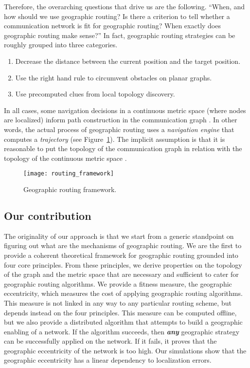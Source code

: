\documentclass{article}
\begin{document}
Therefore, the overarching questions that drive us are the following. ``When, and how should we use geographic routing? Is there a criterion to tell whether a communication network is fit for geographic routing? When exactly does geographic routing make sense?''
In fact, geographic routing strategies can be roughly grouped into three categories.
\begin{enumerate}
\item Decrease the distance between the current position and the target position.
\item Use the right hand rule to circumvent obstacles on planar graphs.
\item Use precomputed clues from local topology discovery.
\end{enumerate}
In all cases, some navigation decisions in a continuous metric space  (where nodes are localized) inform path construction in the communication graph . In other words, the actual process of geographic routing uses a {\em navigation engine} that computes a {\em trajectory} (see Figure~\ref{fig_routing}). The implicit assumption is that it is reasonable to put the topology of the communication graph  in relation with the topology of the continuous metric space .

\begin{figure}[h]
\begin{center}
\texttt{[image: routing\_framework]}
\caption{Geographic routing framework.}
\label{fig_routing}
\end{center}
\end{figure}

\subsection*{Our contribution}
The originality of our approach is that we start from a generic standpoint on figuring out what are the mechanisms of geographic routing. We are the first to provide a coherent theoretical framework for geographic routing grounded into four core principles. From these principles, we derive properties on the topology of the graph and the metric space that are necessary and sufficient to cater for geographic routing algorithms. We provide a fitness measure, the geographic eccentricity, which measures the cost of applying geographic routing algorithms. This measure is not linked in any way to any particular routing scheme, but depends instead on the four principles.
 This measure can be computed offline, but we also provide a distributed algorithm that attempts to build a geographic enabling of a network. If the algorithm succeeds, then {\bf \em any} geographic strategy can be successfully applied on the network. If it fails, it proves that the geographic eccentricity of the network is too high. Our simulations show that the geographic eccentricity has a linear dependency to localization errors.
\end{document}

